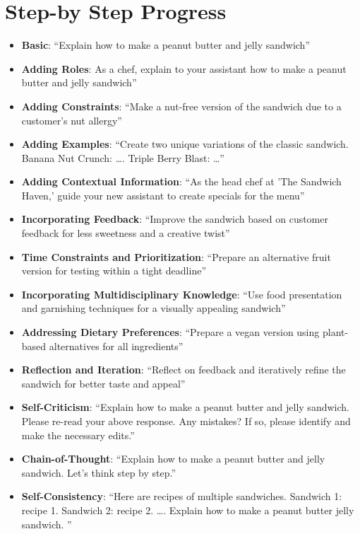 \section{Step-by Step Progress}

\begin{itemize}
\itemsep-0.25em %
\item \textbf{Basic}: ``Explain how to make a peanut butter and jelly sandwich''
\item \textbf{Adding Roles}: As a chef, explain to your assistant how to make a peanut butter and jelly sandwich''
\item \textbf{Adding Constraints}: ``Make a nut-free version of the sandwich due to a customer's nut allergy''
\item \textbf{Adding Examples}: ``Create two unique variations of the classic sandwich. Banana Nut Crunch: \ldots. Triple Berry Blast: \ldots ''
\item \textbf{Adding Contextual Information}: ``As the head chef at 'The Sandwich Haven,' guide your new assistant to create specials for the menu''
\item \textbf{Incorporating Feedback}: ``Improve the sandwich based on customer feedback for less sweetness and a creative twist''
\item \textbf{Time Constraints and Prioritization}: ``Prepare an alternative fruit version for testing within a tight deadline''
\item \textbf{Incorporating Multidisciplinary Knowledge}: ``Use food presentation and garnishing techniques for a visually appealing sandwich''
\item \textbf{Addressing Dietary Preferences}: ``Prepare a vegan version using plant-based alternatives for all ingredients''
\item \textbf{Reflection and Iteration}: ``Reflect on feedback and iteratively refine the sandwich for better taste and appeal''
\item \textbf{Self-Criticism}: ``Explain how to make a peanut butter and jelly sandwich. Please re-read your above response. Any mistakes? If so, please identify and make the necessary edits.''
\item \textbf{Chain-of-Thought}: ``Explain how to make a peanut butter and jelly sandwich. Let’s think step by step.''
\item \textbf{Self-Consistency}: ``Here are recipes of multiple sandwiches. Sandwich 1: recipe 1. Sandwich 2: recipe 2. \ldots. Explain how to make a peanut butter jelly sandwich. ''

\end{itemize}

